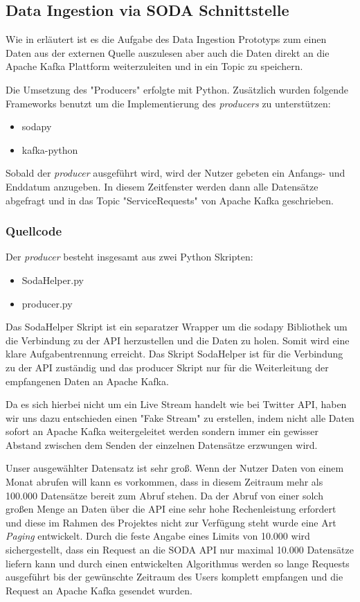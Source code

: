 \subsection{Data Ingestion via \ac{SODA} Schnittstelle}
Wie in  erläutert ist es die Aufgabe des Data Ingestion Prototyps zum einen Daten aus der externen Quelle auszulesen
aber auch die Daten direkt an die Apache Kafka Plattform weiterzuleiten und in ein Topic zu speichern.

Die Umsetzung des "Producers" erfolgte mit Python.
Zusätzlich wurden folgende Frameworks benutzt um die Implementierung des \textit{producers} zu unterstützen:

\begin{itemize}
  \item sodapy
  \item kafka-python
\end{itemize}

Sobald der \textit{producer} ausgeführt wird, wird der Nutzer gebeten ein Anfangs- und Enddatum anzugeben.
In diesem Zeitfenster werden dann alle Datensätze abgefragt und in das Topic "ServiceRequests" von Apache Kafka geschrieben.

\subsubsection{Quellcode}
Der \textit{producer} besteht insgesamt aus zwei Python Skripten:

\begin{itemize}
  \item SodaHelper.py
  \item producer.py
\end{itemize}

Das SodaHelper Skript ist ein separatzer Wrapper um die sodapy Bibliothek um die Verbindung zu der API herzustellen und die Daten zu holen.
Somit wird eine klare Aufgabentrennung erreicht.
Das Skript SodaHelper ist für die Verbindung zu der API zuständig und das producer Skript nur für die Weiterleitung der empfangenen Daten an Apache Kafka.

Da es sich hierbei nicht um ein Live Stream handelt wie \zb{} bei Twitter API, haben wir uns dazu entschieden einen "Fake Stream" zu erstellen,
indem nicht alle Daten sofort an Apache Kafka weitergeleitet werden sondern immer ein gewisser Abstand zwischen dem Senden der einzelnen Datensätze
erzwungen wird.

Unser ausgewählter Datensatz ist sehr groß. Wenn \zb{} der Nutzer Daten von einem Monat abrufen will kann es vorkommen, dass in diesem Zeitraum mehr als 100.000 Datensätze
bereit zum Abruf stehen.
Da der Abruf von einer solch großen Menge an Daten über die API eine sehr hohe Rechenleistung erfordert und diese im Rahmen des Projektes nicht zur Verfügung steht wurde
eine Art \textit{Paging} entwickelt.
Durch die feste Angabe eines Limits von 10.000 wird sichergestellt, dass ein Request an die \ac{SODA} \ac{API} nur maximal 10.000
Datensätze liefern kann und durch einen entwickelten Algorithmus werden so lange Requests ausgeführt bis der gewünschte Zeitraum des Users komplett empfangen und
die Request an Apache Kafka gesendet wurden.

